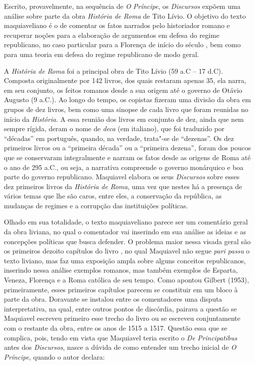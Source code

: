 Escrito, provavelmente, na sequência de \emph{O} \emph{Príncipe}, os
\emph{Discursos} expõem uma análise sobre parte da obra \emph{História
de Roma} de Tito Lívio. O objetivo do texto maquiaveliano é o de
comentar os fatos narrados pelo historiador romano e recuperar noções
para a elaboração de argumentos em defesa do regime republicano, no caso
particular para a Florença de início do século , bem como para uma
teoria em defesa do regime republicano de modo geral.

A \emph{História de Roma} foi a principal obra de Tito Lívio (59 a.C --
17 d.C). Composta originalmente por 142 livros, dos quais restaram
apenas 35, ela narra, em seu conjunto, os feitos romanos desde a sua
origem até o governo de Otávio Augusto (9 a.C.). Ao longo do tempo, os
copistas fizeram uma divisão da obra em grupos de dez livros, bem como
uma sinopse de cada livro que foram reunidas no início da
\emph{História}. A essa reunião dos livros em conjunto de dez, ainda que
nem sempre rígida, deram o nome de \emph{deca} (em italiano), que foi
traduzido por ``décadas'' em português, quando, na verdade, trata"-se de
``dezenas''. Os dez primeiros livros ou a ``primeira década'' ou a
``primeira dezena'', foram dos poucos que se conservaram
integralmente e narram os fatos desde as origens de Roma até o ano de
295 a.C., ou seja, a narrativa compreende o governo monárquico e boa
parte do governo republicano. Maquiavel elabora os seus \emph{Discursos}
sobre esses dez primeiros livros da \emph{História de Roma}, uma vez que
nestes há a presença de vários temas que lhe são caros, entre eles, a
conservação da república, as mudanças de regimes e a corrupção das
instituições políticas.

Olhado em sua totalidade, o texto maquiaveliano parece ser um comentário
geral da obra liviana, no qual o comentador vai inserindo em sua análise
as ideias e as concepções políticas que busca defender. O problema maior
nessa visada geral são os primeiros dezoito capítulos do livro , no
qual Maquiavel não segue
\emph{pari passu} o
texto liviano, mas faz uma exposição ampla sobre alguns conceitos
republicanos, inserindo nessa análise exemplos romanos, mas também
exemplos de Esparta, Veneza, Florença e a Roma católica de seu tempo.
Como apontou Gilbert (1953), primeiramente, esses primeiros capítulos
parecem se constituir em um bloco à parte da obra. Doravante se instalou
entre os comentadores uma disputa interpretativa, na qual, entre outros
pontos de discórdia, pairava a questão se Maquiavel escreveu primeiro
esse trecho do livro ou se escreveu conjuntamente com o restante da
obra, entre os anos de 1515 a 1517. Questão essa que se complica, pois,
tendo em vista que Maquiavel teria escrito o \emph{De Principatibus}
antes dos \emph{Discursos}, nasce a dúvida de como entender um trecho
inicial de \emph{O Príncipe}, quando o autor declara:

